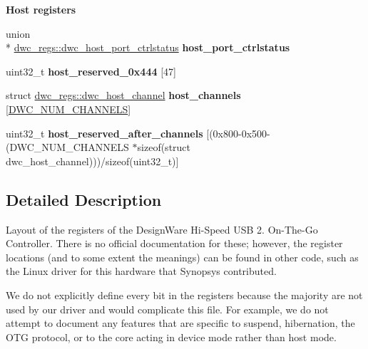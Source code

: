 \begin{Indent}{\bf Host registers}
\begin{DoxyCompactItemize}
\item 
\hypertarget{structdwc__regs_ac4d28938734103fe4e209ebc59f7bb73}{union \\*
\hyperlink{uniondwc__regs_1_1dwc__host__port__ctrlstatus}{dwc\-\_\-regs\-::dwc\-\_\-host\-\_\-port\-\_\-ctrlstatus} {\bfseries host\-\_\-port\-\_\-ctrlstatus}}\label{structdwc__regs_ac4d28938734103fe4e209ebc59f7bb73}

\item 
\hypertarget{structdwc__regs_a06fcde39ba2d6bbe8cde93c2ccd9c9e0}{uint32\-\_\-t {\bfseries host\-\_\-reserved\-\_\-0x444} \mbox{[}47\mbox{]}}\label{structdwc__regs_a06fcde39ba2d6bbe8cde93c2ccd9c9e0}

\item 
\hypertarget{structdwc__regs_ae453402456e1c85b26e5a7b2ceaaa80b}{struct \hyperlink{structdwc__regs_1_1dwc__host__channel}{dwc\-\_\-regs\-::dwc\-\_\-host\-\_\-channel} {\bfseries host\-\_\-channels} \mbox{[}\hyperlink{usb__dwc__regs_8h_a786cf2c77230c0d1ed90bbb48ee212c8}{D\-W\-C\-\_\-\-N\-U\-M\-\_\-\-C\-H\-A\-N\-N\-E\-L\-S}\mbox{]}}\label{structdwc__regs_ae453402456e1c85b26e5a7b2ceaaa80b}

\item 
\hypertarget{structdwc__regs_a5bdf36f3ab3979409d51477e3eca96cb}{uint32\-\_\-t {\bfseries host\-\_\-reserved\-\_\-after\-\_\-channels} \mbox{[}(0x800-\/0x500-\/(\-D\-W\-C\-\_\-\-N\-U\-M\-\_\-\-C\-H\-A\-N\-N\-E\-L\-S $\ast$sizeof(struct dwc\-\_\-host\-\_\-channel)))/sizeof(uint32\-\_\-t)\mbox{]}}\label{structdwc__regs_a5bdf36f3ab3979409d51477e3eca96cb}

\end{DoxyCompactItemize}
\end{Indent}


\subsection{Detailed Description}
Layout of the registers of the Design\-Ware Hi-\/\-Speed U\-S\-B 2. On-\/\-The-\/\-Go Controller. There is no official documentation for these; however, the register locations (and to some extent the meanings) can be found in other code, such as the Linux driver for this hardware that Synopsys contributed.

We do not explicitly define every bit in the registers because the majority are not used by our driver and would complicate this file. For example, we do not attempt to document any features that are specific to suspend, hibernation, the O\-T\-G protocol, or to the core acting in device mode rather than host mode.

